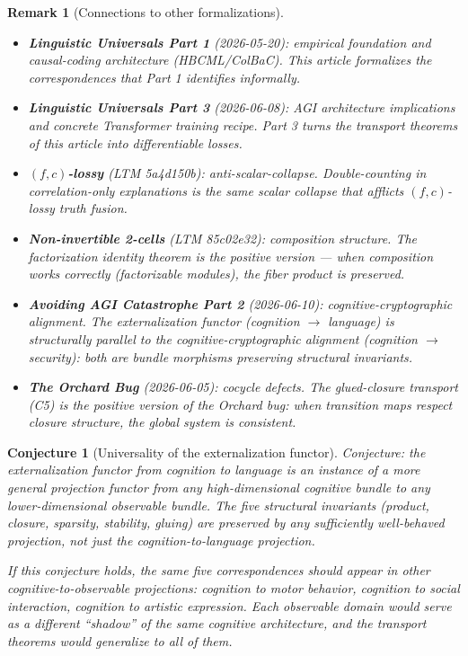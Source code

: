 \documentclass[11pt,a4paper]{article}
\newtheorem{conjecture}[definition]{Conjecture}
\newtheorem{remark}[definition]{Remark}
\begin{document}
\begin{remark}[Connections to other formalizations]
\begin{itemize}
\item \textbf{Linguistic Universals Part 1} (2026-05-20): empirical
  foundation and causal-coding architecture (HBCML/ColBaC). This
  article formalizes the correspondences that Part 1 identifies
  informally.
\item \textbf{Linguistic Universals Part 3} (2026-06-08): AGI
  architecture implications and concrete Transformer training
  recipe. Part 3 turns the transport theorems of this article into
  differentiable losses.
\item \textbf{$(f,c)$-lossy} (LTM 5a4d150b): anti-scalar-collapse.
  Double-counting in correlation-only explanations is the same
  scalar collapse that afflicts $(f,c)$-lossy truth fusion.
\item \textbf{Non-invertible 2-cells} (LTM 85c02e32): composition
  structure. The factorization identity theorem is the positive
  version --- when composition works correctly (factorizable
  modules), the fiber product is preserved.
\item \textbf{Avoiding AGI Catastrophe Part 2} (2026-06-10):
  cognitive-cryptographic alignment. The externalization functor
  (cognition $\to$ language) is structurally parallel to the
  cognitive-cryptographic alignment (cognition $\to$ security):
  both are bundle morphisms preserving structural invariants.
\item \textbf{The Orchard Bug} (2026-06-05): cocycle defects.
  The glued-closure transport (C5) is the positive version of
  the Orchard bug: when transition maps respect closure structure,
  the global system is consistent.
\end{itemize}
\end{remark}

\begin{conjecture}[Universality of the externalization functor]
Conjecture: the externalization functor from cognition to language
is an instance of a more general \emph{projection functor} from
any high-dimensional cognitive bundle to any lower-dimensional
observable bundle. The five structural invariants (product, closure,
sparsity, stability, gluing) are preserved by any sufficiently
well-behaved projection, not just the cognition-to-language
projection.

If this conjecture holds, the same five correspondences should
appear in other cognitive-to-observable projections: cognition to
motor behavior, cognition to social interaction, cognition to
artistic expression. Each observable domain would serve as a
different ``shadow'' of the same cognitive architecture, and the
transport theorems would generalize to all of them.
\end{conjecture}
\end{document}
